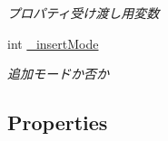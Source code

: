 \begin{DoxyCompactItemize}
\begin{DoxyCompactList}\small\item\em プロパティ受け渡し用変数 \end{DoxyCompactList}\item 
\hypertarget{interface_comment_view_controller_ab5c7552c93688b35ab21271ac23e0e37}{
int \hyperlink{interface_comment_view_controller_ab5c7552c93688b35ab21271ac23e0e37}{\_\-insertMode}}
\label{interface_comment_view_controller_ab5c7552c93688b35ab21271ac23e0e37}

\begin{DoxyCompactList}\small\item\em 追加モードか否か \end{DoxyCompactList}\end{DoxyCompactItemize}
\subsection*{Properties}
